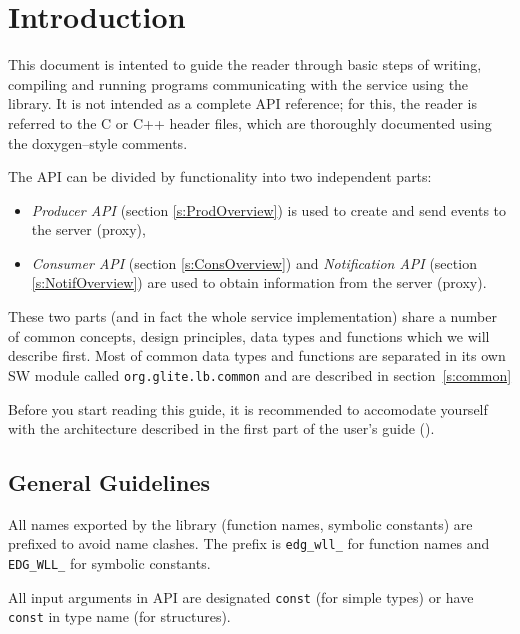 
\section{Introduction}



This document is intented to guide the reader through basic steps
of writing, compiling and running programs communicating with the \LB
service using the \LB library. It is not intended as a complete API
reference; for this, the reader is referred to the C or C++ header
files, which are thoroughly documented using the doxygen--style
comments. 

The \LB API can be divided by functionality into two independent
parts:
\begin{itemize}
\item \textit{\LB Producer API} (section \ref{s:ProdOverview}) is used
to create and send events to the \LB server (proxy),
\item \textit{\LB Consumer API} (section \ref{s:ConsOverview}) and \textit{\LB
Notification API} (section \ref{s:NotifOverview}) are used to obtain
information from the  \LB server (proxy).
\end{itemize}
These two parts (and in fact the whole \LB service implementation)
share a number of common concepts, design principles, data types and
functions which we will describe first. Most of common data types and
functions are separated in its own SW module called
\texttt{org.glite.lb.common} and are described in section~\ref{s:common}

Before you start reading this guide, it is recommended to accomodate
yourself with the \LB architecture described in the first part of the
\LB user's guide (\cite{lbug}).


\subsection{General Guidelines}

All names exported by the \LB library (function names, symbolic
constants) are prefixed to avoid name clashes. The prefix is
\lstinline'edg_wll_' for function names and \lstinline'EDG_WLL_' for
symbolic constants.

All input arguments in \LB API are designated \lstinline'const' (for simple
types) or have \texttt{const} in type name (for structures).

